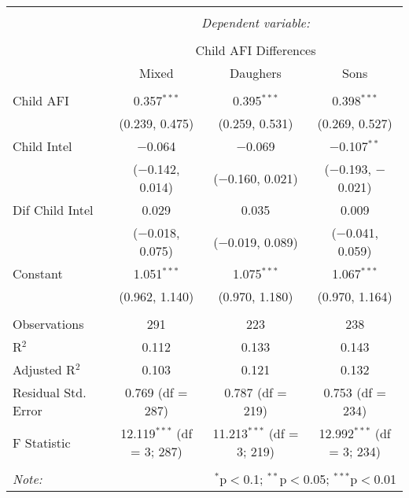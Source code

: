 
\begingroup 
\small 
\begin{tabular}{@{\extracolsep{1pt}}lccc} 
\\[-1.8ex]\hline 
\hline \\[-1.8ex] 
 & \multicolumn{3}{c}{\textit{Dependent variable:}} \\ 
\cline{2-4} 
\\[-1.8ex] & \multicolumn{3}{c}{Child AFI Differences} \\ 
 & Mixed & Daughers & Sons \\ 
\hline \\[-1.8ex] 
 Child AFI & 0.357$^{***}$ & 0.395$^{***}$ & 0.398$^{***}$ \\ 
  & (0.239, 0.475) & (0.259, 0.531) & (0.269, 0.527) \\ 
  Child Intel & $-$0.064 & $-$0.069 & $-$0.107$^{**}$ \\ 
  & ($-$0.142, 0.014) & ($-$0.160, 0.021) & ($-$0.193, $-$0.021) \\ 
  Dif Child Intel & 0.029 & 0.035 & 0.009 \\ 
  & ($-$0.018, 0.075) & ($-$0.019, 0.089) & ($-$0.041, 0.059) \\ 
  Constant & 1.051$^{***}$ & 1.075$^{***}$ & 1.067$^{***}$ \\ 
  & (0.962, 1.140) & (0.970, 1.180) & (0.970, 1.164) \\ 
 \hline \\[-1.8ex] 
Observations & 291 & 223 & 238 \\ 
R$^{2}$ & 0.112 & 0.133 & 0.143 \\ 
Adjusted R$^{2}$ & 0.103 & 0.121 & 0.132 \\ 
Residual Std. Error & 0.769 (df = 287) & 0.787 (df = 219) & 0.753 (df = 234) \\ 
F Statistic & 12.119$^{***}$ (df = 3; 287) & 11.213$^{***}$ (df = 3; 219) & 12.992$^{***}$ (df = 3; 234) \\ 
\hline 
\hline \\[-1.8ex] 
\textit{Note:}  & \multicolumn{3}{r}{$^{*}$p$<$0.1; $^{**}$p$<$0.05; $^{***}$p$<$0.01} \\ 
\end{tabular} 
\endgroup 
